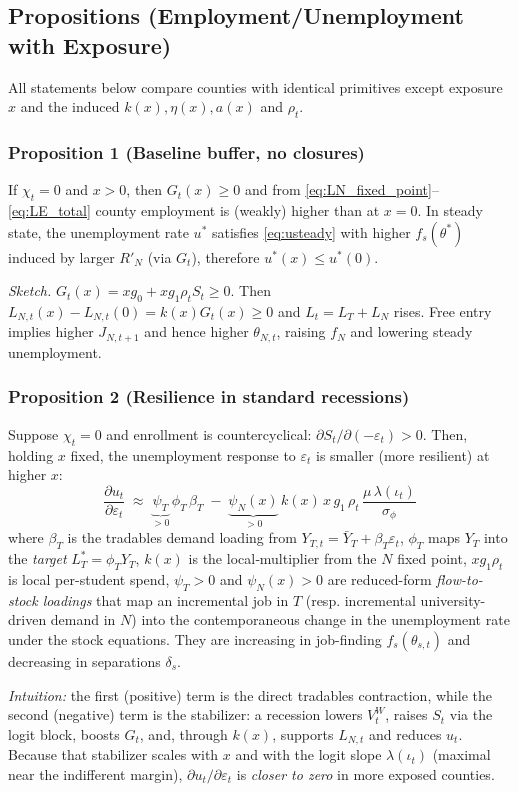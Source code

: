 \subsection*{Propositions (Employment/Unemployment with Exposure)}
All statements below compare counties with identical primitives except exposure $x$ and the induced $k(x),\eta(x),a(x)$ and $\rho_t$.

\subsubsection*{Proposition 1 (Baseline buffer, no closures)}
If $\chi_t=0$ and $x>0$, then $G_t(x)\ge 0$ and from \eqref{eq:LN_fixed_point}–\eqref{eq:LE_total} county employment is (weakly) higher than at $x=0$. In steady state, the unemployment rate $u^\ast$ satisfies \eqref{eq:usteady} with higher $f_s(\theta^\ast)$ induced by larger $R'_N$ (via $G_t$), therefore $u^\ast(x)\le u^\ast(0)$.

\textit{Sketch.} $G_t(x)=xg_0+xg_1\rho_t S_t\ge 0$. Then $L_{N,t}(x)-L_{N,t}(0)=k(x)G_t(x)\ge 0$ and $L_t=L_T+L_N$ rises. Free entry implies higher $J_{N,t+1}$ and hence higher $\theta_{N,t}$, raising $f_N$ and lowering steady unemployment.

\subsubsection*{Proposition 2 (Resilience in standard recessions)}
Suppose $\chi_t=0$ and enrollment is countercyclical: $\partial S_t/\partial(-\varepsilon_t)>0$. Then, holding $x$ fixed, the unemployment response to $\varepsilon_t$ is smaller (more resilient) at higher $x$:
\[
\frac{\partial u_t}{\partial \varepsilon_t}
\;\approx\;
\underbrace{\psi_T}_{>0}\,\phi_T\,\beta_T
\;-\;
\underbrace{\psi_N(x)}_{>0}\,k(x)\,x\,g_1\,\rho_t\,
\frac{\mu\,\lambda(\iota_t)}{\sigma_\phi}
\]
where $\beta_T$ is the tradables demand loading from $Y_{T,t}=\bar Y_T+\beta_T\varepsilon_t$, $\phi_T$ maps $Y_T$ into the \textit{target} $L_T^\ast=\phi_T Y_T$, $k(x)$ is the local‐multiplier from the $N$ fixed point, $x g_1 \rho_t$ is local per-student spend, $\psi_T>0$ and $\psi_N(x)>0$ are reduced-form \textit{flow-to-stock loadings} that map an incremental job in $T$ (resp. incremental university-driven demand in $N$) into the contemporaneous change in the unemployment rate under the stock equations. They are increasing in job-finding $f_s(\theta_{s,t})$ and decreasing in separations $\delta_s$. 

\noindent \textit{Intuition:} the first (positive) term is the direct tradables contraction, while the second (negative) term is the stabilizer: a recession lowers $V_t^W$, raises $S_t$ via the logit block, boosts $G_t$, and, through $k(x)$, supports $L_{N,t}$ and reduces $u_t$. Because that stabilizer scales with $x$ and with the logit slope $\lambda(\iota_t)$ (maximal near the indifferent margin), $\partial u_t/\partial \varepsilon_t$ is \textit{closer to zero} in more exposed counties.



